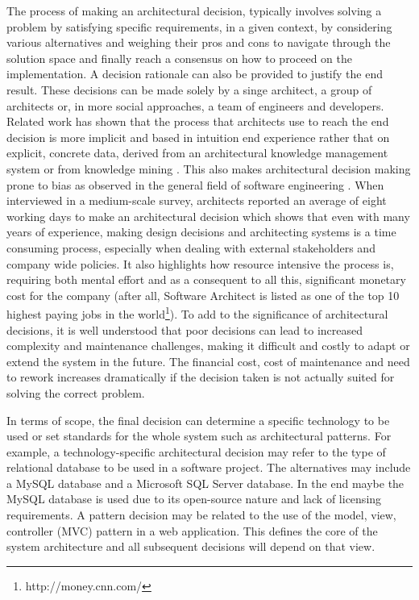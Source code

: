         The process of making an architectural decision, typically involves solving a problem by satisfying specific requirements, in a given context, by considering various alternatives and weighing their pros and cons to navigate through the solution space and finally reach a consensus on how to proceed on the implementation. A decision rationale can also be provided to justify the end result. These decisions can be made solely by a singe architect, a group of architects or, in more social approaches, a team of engineers and developers. Related work has shown that the process that architects use to reach the end decision is more implicit and based in intuition end experience rather that on explicit, concrete data, derived from an architectural knowledge management system or from knowledge mining \cite{Architecture-reasoning}. This also makes architectural decision making prone to bias as observed in the general field of software engineering \cite{bias_in_software_eng}. When interviewed in a medium-scale survey, architects reported an average of eight working days to make an architectural decision which shows that even with many years of experience, making design decisions and architecting systems is a time consuming process, especially when dealing with external stakeholders and company wide policies. It also highlights how resource intensive the process is, requiring both mental effort and as a consequent to all this, significant monetary cost for the company \cite{archtitect_survey} (after all, Software Architect is listed as one of the top 10 highest paying jobs in the world\footnote{http://money.cnn.com/}). To add to the significance of architectural decisions, it is well understood that poor decisions can lead to increased complexity and maintenance challenges, making it difficult and costly to adapt or extend the system in the future. The financial cost, cost of maintenance and need to rework increases dramatically if the decision taken is not actually suited for solving the correct problem.  
        
        In terms of scope, the final decision can determine a specific technology to be used \cite{developer-study-arch-decisions} or set standards for the whole system such as architectural patterns. For example, a technology-specific architectural decision may refer to the type of relational database to be used in a software project. The alternatives may include a MySQL database and a Microsoft SQL Server database. In the end maybe the MySQL database is used due to its open-source nature and lack of licensing requirements. A pattern decision may be related to the use of the model, view, controller (MVC) pattern in a web application. This defines the core of the system architecture and all subsequent decisions will depend on that view.


